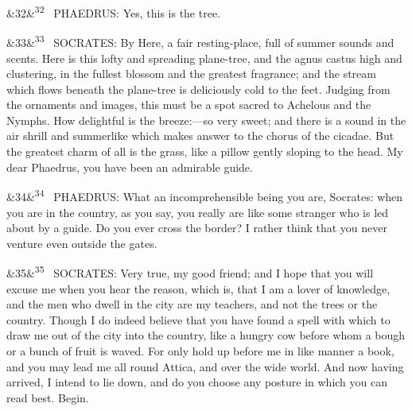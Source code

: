\documentclass[12pt]{article}
\newcommand{\para}[1][]{\par\noindent\ifx&#1&\else\textsuperscript{\footnotesize #1}~\fi}
\begin{document}
\para[32] PHAEDRUS: Yes, this is the tree.

\para[33] SOCRATES: By Here, a fair resting-place, full of summer sounds and scents. Here is this lofty and spreading plane-tree, and the agnus castus high and clustering, in the fullest blossom and the greatest fragrance; and the stream which flows beneath the plane-tree is deliciously cold to the feet. Judging from the ornaments and images, this must be a spot sacred to Achelous and the Nymphs. How delightful is the breeze:---so very sweet; and there is a sound in the air shrill and summerlike which makes answer to the chorus of the cicadae. But the greatest charm of all is the grass, like a pillow gently sloping to the head. My dear Phaedrus, you have been an admirable guide.

\para[34] PHAEDRUS: What an incomprehensible being you are, Socrates: when you are in the country, as you say, you really are like some stranger who is led about by a guide. Do you ever cross the border? I rather think that you never venture even outside the gates.

\para[35] SOCRATES: Very true, my good friend; and I hope that you will excuse me when you hear the reason, which is, that I am a lover of knowledge, and the men who dwell in the city are my teachers, and not the trees or the country. Though I do indeed believe that you have found a spell with which to draw me out of the city into the country, like a hungry cow before whom a bough or a bunch of fruit is waved. For only hold up before me in like manner a book, and you may lead me all round Attica, and over the wide world. And now having arrived, I intend to lie down, and do you choose any posture in which you can read best. Begin.
\end{document}
